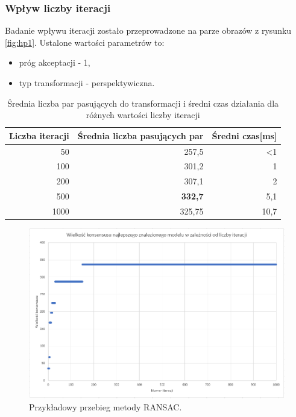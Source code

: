 \documentclass{article}
\begin{document}
	\subsubsection{Wpływ liczby iteracji}
	Badanie wpływu iteracji zostało przeprowadzone na parze obrazów z rysunku \ref{fig:hp1}. Ustalone wartości parametrów to:
	\begin{itemize}
		\item próg akceptacji - 1,
		\item typ transformacji - perspektywiczna.
	\end{itemize}
	\begin{table}[H]
		\centering
		\caption{Średnia liczba par pasujących do transformacji i średni czas działania dla różnych wartości liczby iteracji}
		\label{tab:iterations}
		\begin{tabular}{|r|r|r|}
			\hline
			\multicolumn{1}{|l|}{\textbf{Liczba iteracji}} & \multicolumn{1}{l|}{\textbf{Średnia liczba pasujących par}} & \multicolumn{1}{l|}{\textbf{Średni czas{[}ms{]}}} \\ \hline
			50                                             & 257,5                                                         & \textless{}1                                      \\ \hline
			100                                            & 301,2                                                         & 1                                                 \\ \hline
			200                                            & 307,1                                                         & 2                                                 \\ \hline
			500                                            & \textbf{332,7}                                                         & 5,1                                               \\ \hline
			1000                                           & 325,75                                                        & 10,7                                              \\ \hline
		\end{tabular}
	\end{table}
	\begin{figure}[H]
		\centering
		\includegraphics[width=\linewidth]{wykres1.png}
		\caption{Przykładowy przebieg metody RANSAC.}
		\label{fig:ransac_run}
	\end{figure}
\end{document}
